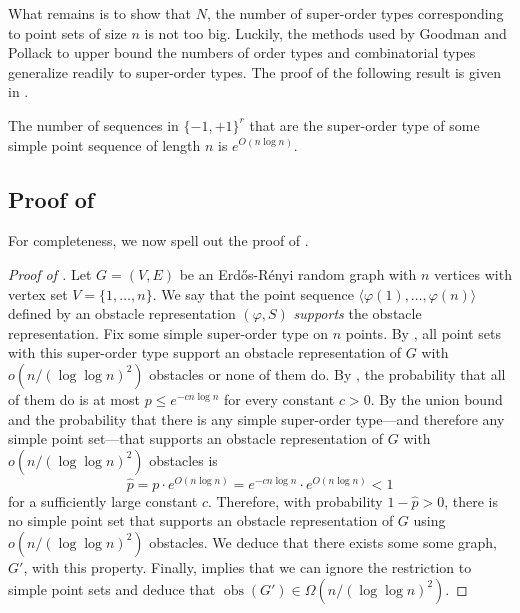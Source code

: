 \documentclass{patmorin}
\DeclareMathOperator{\obs}{obs}
\begin{document}
What remains is to show that $N$, the number of super-order types
corresponding to point sets of size $n$ is not too big.  Luckily,
the methods used by Goodman and Pollack \cite{goodman.pollack:upper}
to upper bound the numbers of order types and combinatorial types
generalize readily to super-order types.  The proof of the following
result is given in .

\begin{lem}
  The number of sequences in $\{{-1},{+1}\}^{r}$ that are the super-order
  type of some simple point sequence of length $n$ is $e^{O(n\log n)}$.
\end{lem}

\subsection{Proof of }

For completeness, we now spell out the proof of .

\begin{proof}[Proof of ]
  Let $G=(V,E)$ be an Erd\H{o}s-R\'enyi random graph with $n$ vertices
  with vertex set $V=\{1,\ldots,n\}$.
  We say that the point sequence $\langle \varphi(1),\ldots,\varphi(n)\rangle$
  defined by an
  obstacle representation $(\varphi, S)$ \emph{supports} the obstacle
  representation.  Fix some simple super-order type on $n$ points.
  By , all point sets with this super-order type
  support an obstacle representation of $G$ with $o(n/(\log\log n)^2)$
  obstacles or none of them do.  By , the probability that
  all of them do is at most $p\le e^{-cn\log n}$ for every constant $c>0$.
  By the union bound and  the probability
  that there is any simple super-order type---and therefore any simple
  point set---that supports an obstacle representation of $G$ with
  $o(n/(\log\log n)^2)$ obstacles is
  \[
     \hat p = p\cdot e^{O(n\log n)} = e^{-cn\log n}\cdot e^{O(n\log n)} < 1
  \]
  for a sufficiently large constant $c$.  Therefore, with probability
  $1-\hat p > 0$, there is no simple point set that supports an obstacle
  representation of $G$ using $o(n/(\log\log n)^2)$ obstacles. We deduce
  that there exists some some graph, $G'$, with this property.  Finally,
   implies that we can ignore the restriction to simple
  point sets and deduce that $\obs(G')\in \Omega(n/(\log\log n)^2)$.
\end{proof}
\end{document}
